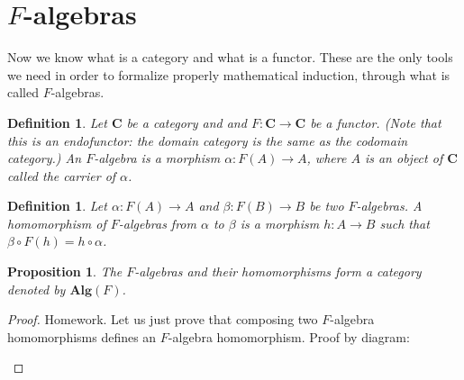 \documentclass[11pt,a4paper]{article}
\newtheorem{defi}[theo]{Definition}
\newtheorem{prop}[theo]{Proposition}
\newcommand{\gr}{\textbf}
\newcommand{\1}{\mathbbm{1}}
\begin{document}
\section{$F$-algebras}
Now we know what is a category and what is a functor. These are the only tools we need in order to formalize properly mathematical induction, through what is called $F$-algebras.
\begin{defi}
Let $\gr{C}$ be a category and and $F : \gr{C} \to \gr{C}$ be a functor. (Note that this is an endofunctor: the domain category is the same as the codomain category.) An $F$-algebra is a morphism $\alpha : F(A) \to A$, where $A$ is an object of $\gr{C}$ called the carrier of $\alpha$.
\end{defi}
\begin{defi} Let $\alpha : F(A) \to A$ and $\beta : F(B) \to B$ be two $F$-algebras. A homomorphism of $F$-algebras from $\alpha$ to $\beta$ is a morphism $h : A \to B$ such that $\beta \circ F(h) = h \circ \alpha$.
\end{defi}
\begin{center}
\end{center}
\begin{prop}
The $F$-algebras and their homomorphisms form a category denoted by $\gr{Alg}(F)$.
\end{prop}
\begin{proof}[Proof] Homework. Let us just prove that composing two $F$-algebra homomorphisms defines an $F$-algebra homomorphism. Proof by diagram:
\begin{center}
\end{center}
\end{proof}
\end{document}
